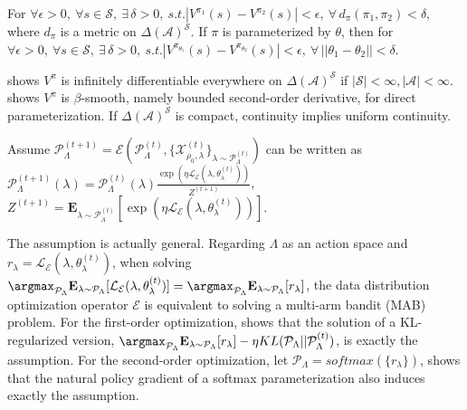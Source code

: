 \begin{Assumption}
    For $\forall \epsilon > 0,\  \forall s \in \mathcal{S},\ \exists\, \delta > 0,\ s.t. |V^{\pi_1} (s) - V^{\pi_2} (s)| < \epsilon,\ \forall\, d_{\pi} (\pi_1, \pi_2) < \delta$,
    where $d_\pi$ is a metric on ${\Delta(\mathcal{A})}^\mathcal{S}$.
    If $\pi$ is parameterized by $\theta$, then for $\forall \epsilon > 0,\  \forall s \in \mathcal{S},\ \exists\, \delta > 0,\ s.t. |V^{\pi_{\theta_1}} (s) - V^{\pi_{\theta_2}} (s)| < \epsilon,\ \forall\, || \theta_1 - \theta_2 || < \delta$.
\label{asp:1}
\end{Assumption}
\begin{Remark}
    \citep{polytope} shows $V^\pi$ is infinitely differentiable everywhere on $\Delta (\mathcal{A})^{\mathcal{S}}$ if $|\mathcal{S}| < \infty, |\mathcal{A}| < \infty$.
    \citep{pgtheory} shows $V^\pi$ is $\beta$-smooth, namely bounded second-order derivative, for direct parameterization.
    If $\Delta (\mathcal{A})^{\mathcal{S}}$ is compact, continuity implies uniform continuity.
\end{Remark}

\begin{Assumption}
    Assume
    $\mathcal{P}_{\Lambda}^{(t+1)} 
    = \mathcal{E}(\mathcal{P}_{\Lambda}^{(t)}, \{\mathcal{X}^{(t)}_{\rho_0, \lambda}\}_{\lambda \sim \mathcal{P}^{(t)}_{\Lambda}}) $
    can be written as 
    $\mathcal{P}_{\Lambda}^{(t+1)} (\lambda)= \mathcal{P}_{\Lambda}^{(t)}(\lambda) \frac{\exp (\eta \mathcal{L}_{\mathcal{E}} (\lambda, \theta_{\lambda}^{(t)})  )}{Z^{(t+1)}}$, 
    $Z^{(t+1)} = \textbf{E}_{\lambda \sim \mathcal{P}_{\Lambda}^{(t)}}[\exp (\eta \mathcal{L}_{\mathcal{E}} (\lambda, \theta_{\lambda}^{(t)})  )]$.
\label{asp:2}
\end{Assumption}
\begin{Remark}
    The assumption is actually general.
    Regarding $\Lambda$ as an action space and 
    $r_\lambda 
    = \mathcal{L}_{\mathcal{E}} (\lambda, \theta_{\lambda}^{(t)})$, when solving $\argmax_{\mathcal{P}_{\Lambda}} \textbf{E}_{\lambda \sim \mathcal{P}_{\Lambda}} [\mathcal{L}_{\mathcal{E}} (\lambda, \theta_{\lambda}^{(t)})] 
    = \argmax_{\mathcal{P}_{\Lambda}} \textbf{E}_{\lambda \sim \mathcal{P}_{\Lambda}} [r_\lambda]$, the data distribution optimization operator $\mathcal{E}$ is equivalent to solving a multi-arm bandit (MAB) problem.
    For the first-order optimization, \citep{eq_pg_q} shows that the solution of a KL-regularized version, $\argmax_{\mathcal{P}_{\Lambda}} \textbf{E}_{\lambda \sim \mathcal{P}_{\Lambda}} [r_\lambda] - \eta KL(\mathcal{P}_{\Lambda} || \mathcal{P}_{\Lambda}^{(t)})$, is exactly the assumption.
    For the second-order optimization, let $\mathcal{P}_{\Lambda} = softmax (\{r_\lambda\})$, \citep{pgtheory} shows that the natural policy gradient of a softmax parameterization also induces exactly the assumption.
\end{Remark}

